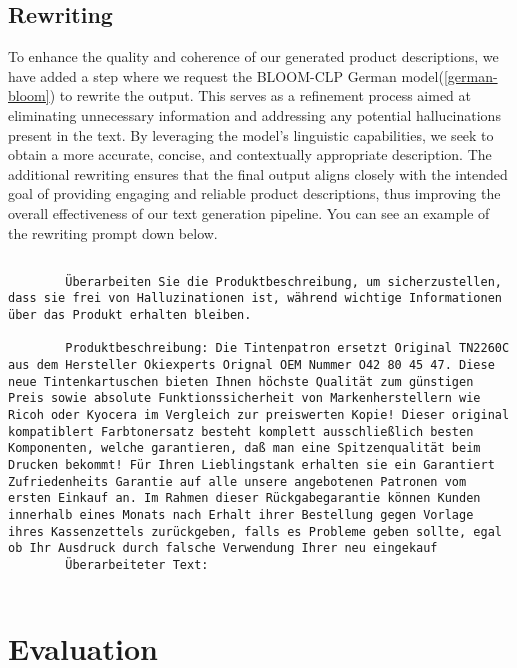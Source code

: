 \subsection{Rewriting}


To enhance the quality and coherence of our generated product descriptions, we have added a step where we request the BLOOM-CLP German model(\autoref{german-bloom}) to rewrite the output. This serves as a refinement process aimed at eliminating unnecessary information and addressing any potential hallucinations present in the text. By leveraging the model's linguistic capabilities, we seek to obtain a more accurate, concise, and contextually appropriate description. The additional rewriting ensures that the final output aligns closely with the intended goal of providing engaging and reliable product descriptions, thus improving the overall effectiveness of our text generation pipeline. You can see an example of the rewriting prompt down below.

{\tiny
	\begin{lstlisting}[breaklines=true, caption={a sample rewriting prompt}, captionpos=b]
		
		Überarbeiten Sie die Produktbeschreibung, um sicherzustellen, dass sie frei von Halluzinationen ist, während wichtige Informationen über das Produkt erhalten bleiben. 
		
		Produktbeschreibung: Die Tintenpatron ersetzt Original TN2260C aus dem Hersteller Okiexperts Orignal OEM Nummer O42 80 45 47. Diese neue Tintenkartuschen bieten Ihnen höchste Qualität zum günstigen Preis sowie absolute Funktionssicherheit von Markenherstellern wie Ricoh oder Kyocera im Vergleich zur preiswerten Kopie! Dieser original kompatiblert Farbtonersatz besteht komplett ausschließlich besten Komponenten, welche garantieren, daß man eine Spitzenqualität beim Drucken bekommt! Für Ihren Lieblingstank erhalten sie ein Garantiert Zufriedenheits Garantie auf alle unsere angebotenen Patronen vom ersten Einkauf an. Im Rahmen dieser Rückgabegarantie können Kunden innerhalb eines Monats nach Erhalt ihrer Bestellung gegen Vorlage ihres Kassenzettels zurückgeben, falls es Probleme geben sollte, egal ob Ihr Ausdruck durch falsche Verwendung Ihrer neu eingekauf
		Überarbeiteter Text:
		
	\end{lstlisting}
}


\section{Evaluation}


